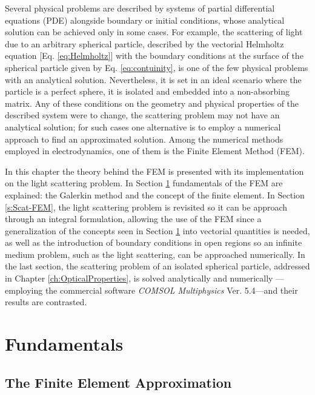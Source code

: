 \documentclass[11pt]{Latex/Classes/PhDthesisPSnPDF}
\begin{document}
    Several physical problems are described by systems of partial differential equations (PDE) alongside boundary or initial conditions, whose analytical solution can be achieved only in some cases. For example, the scattering of light due to an arbitrary spherical particle, described by the vectorial Helmholtz equation [Eq. \eqref{eq:Helmholtz}] with the boundary conditions at the surface of the spherical particle given by Eq. \eqref{eq:contuinity},   is one of the few physical problems with an analytical solution. Nevertheless, it is set in an ideal scenario where the particle is a perfect sphere, it is isolated and embedded into a non-absorbing matrix. Any of  these conditions on the geometry and physical properties of the described system were to change, the scattering problem may not have an analytical solution;  for such cases one alternative is to employ a numerical approach to find an approximated solution.  Among the numerical methods employed in electrodynamics, one of them is the Finite Element Method (FEM).

    In this chapter the theory behind the FEM is presented with its implementation on the light scattering problem. In Section \ref{s:FEM-Fund} fundamentals of the FEM are explained: the Galerkin method and the concept of the finite element. In Section \ref{s:Scat-FEM}, the light scattering problem is revisited so it can be approach through an integral formulation, allowing the use of the FEM since a generalization of the concepts seen in Section \ref{s:FEM-Fund}  into vectorial quantities is needed, as well as the introduction of boundary conditions in open regions so an infinite medium problem, such as the light scattering, can be approached numerically. In the last section, the scattering problem of an isolated spherical particle, addressed in Chapter \ref{ch:OpticalProperties}, is solved analytically and numerically ---employing the commercial software \textit{COMSOL Multiphysics} Ver. 5.4---and their results are contrasted.

    \section{Fundamentals}
     \label{s:FEM-Fund}
     

        \subsection{The Finite Element Approximation}
         \label{ss:FEM-FE}
         
\end{document}

